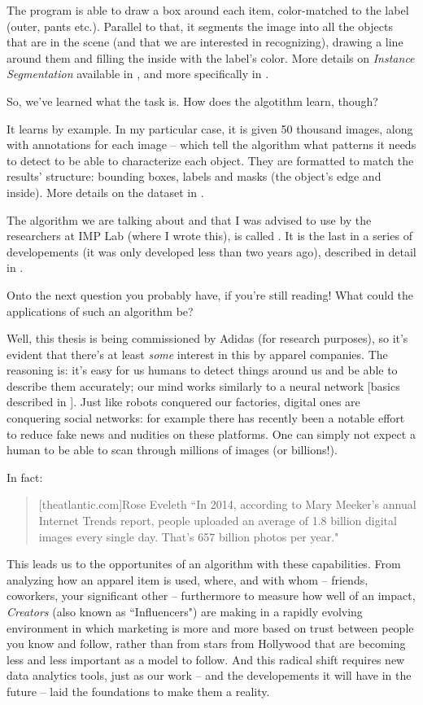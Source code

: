 The program is able to draw a box around each item, color-matched to the label (outer, pants etc.). Parallel to that, it segments the image into all the objects that are in the scene (and that we are interested in recognizing), drawing a line around them and filling the inside with the label's color.
More details on \emph{Instance Segmentation} available in , and more specifically in .

So, we've learned what the task is. How does the algotithm learn, though?

It learns by example. In my particular case, it is given 50 thousand images, along with annotations for each image -- which tell the algorithm what patterns it needs to detect to be able to characterize each object.  They are formatted to match the results' structure: bounding boxes, labels and masks (the object's edge and inside). More details on the dataset in \modanet.

The algorithm we are talking about and that I was advised to use by the researchers at IMP Lab (where I wrote this), is called \maskrcnn. It is the last in a series of developements (it was only developed less than two years ago), described in detail in .

Onto the next question you probably have, if you're still reading!
What could the applications of such an algorithm be?

Well, this thesis is being commissioned by Adidas (for research purposes), so it's evident that there's at least \emph{some} interest in this by apparel companies.
The reasoning is: it's easy for us humans to detect things around us and be able to describe them accurately; our mind works similarly to a neural network [basics described in ].
Just like robots conquered our factories, digital ones are conquering social networks:
for example there has recently been a notable effort to reduce fake news and nudities on these platforms. One can simply not expect a human to be able to scan through millions of images (or billions!). 

In fact:
\begin{quote}[theatlantic.com]{Rose Eveleth}
	“In 2014, according to Mary Meeker's annual Internet Trends report, people uploaded an average of 1.8 billion digital images every single day. That's 657 billion photos per year."
\end{quote}

This leads us to the opportunites of an algorithm with these capabilities.
From analyzing how an apparel item is used, where, and with whom -- friends, coworkers, your significant other -- furthermore to measure how well of an impact, \emph{Creators} (also known as “Influencers") are making in a rapidly evolving environment in which marketing is more and more based on trust between people you know and follow, rather than from stars from Hollywood that are becoming less and less important as a model to follow.
And this radical shift requires new data analytics tools, just as our work -- and the developements it will have in the future -- laid the foundations to make them a reality.


